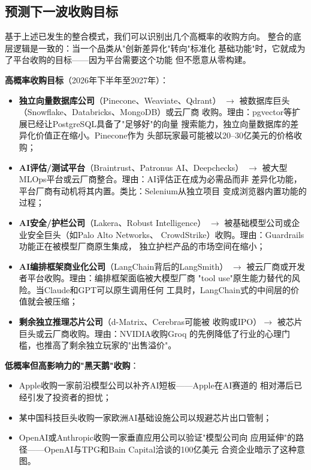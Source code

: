 \subsection{预测下一波收购目标}
\label{subsec:outlook-next-targets}

基于上述已发生的整合模式，我们可以识别出几个高概率的收购方向。
整合的底层逻辑是一致的：当一个品类从"创新差异化"转向"标准化
基础功能"时，它就成为了平台收购的目标——因为平台需要这个功能
但不愿意从零构建。

\begin{keybox}
\textbf{高概率收购目标}（2026年下半年至2027年）：
\begin{itemize}
  \item \textbf{独立向量数据库公司}（Pinecone、Weaviate、Qdrant）
    $\to$ 被数据库巨头（Snowflake、Databricks、MongoDB）或云厂商
    收购。理由：pgvector等扩展已经让PostgreSQL具备了"足够好"的向量
    搜索能力，独立向量数据库的差异化价值正在缩小。Pinecone作为
    头部玩家最可能被以20--30亿美元的价格收购；
  \item \textbf{AI评估/测试平台}（Braintrust、Patronus AI、Deepchecks）
    $\to$ 被大型MLOps平台或云厂商整合。理由：AI评估正在成为必需品而非
    差异化功能，平台厂商有动机将其内置。类比：Selenium从独立项目
    变成浏览器内置功能的过程；
  \item \textbf{AI安全/护栏公司}（Lakera、Robust Intelligence）
    $\to$ 被基础模型公司或企业安全巨头（如Palo Alto Networks、
    CrowdStrike）收购。理由：Guardrails功能正在被模型厂商原生集成，
    独立护栏产品的市场空间在缩小；
  \item \textbf{AI编排框架商业化公司}（LangChain背后的LangSmith）
    $\to$ 被云厂商或开发者平台收购。理由：编排框架面临被大模型厂商
    "tool use"原生能力替代的风险。当Claude和GPT可以原生调用任何
    工具时，LangChain式的中间层的价值就会被压缩；
  \item \textbf{剩余独立推理芯片公司}（d-Matrix、Cerebras可能被
    收购或IPO）$\to$ 被芯片巨头或云厂商收购。理由：NVIDIA收购Groq
    的先例降低了行业的心理门槛，也推高了剩余独立玩家的"出售溢价"。
\end{itemize}

\medskip
\textbf{低概率但高影响力的"黑天鹅"收购}：
\begin{itemize}
  \item Apple收购一家前沿模型公司以补齐AI短板——Apple在AI赛道的
    相对滞后已经引发了投资者的担忧；
  \item 某中国科技巨头收购一家欧洲AI基础设施公司以规避芯片出口管制；
  \item OpenAI或Anthropic收购一家垂直应用公司以验证"模型公司向
    应用延伸"的路径——OpenAI与TPG和Bain Capital洽谈的100亿美元
    合资企业暗示了这种意图。
\end{itemize}
\end{keybox}


